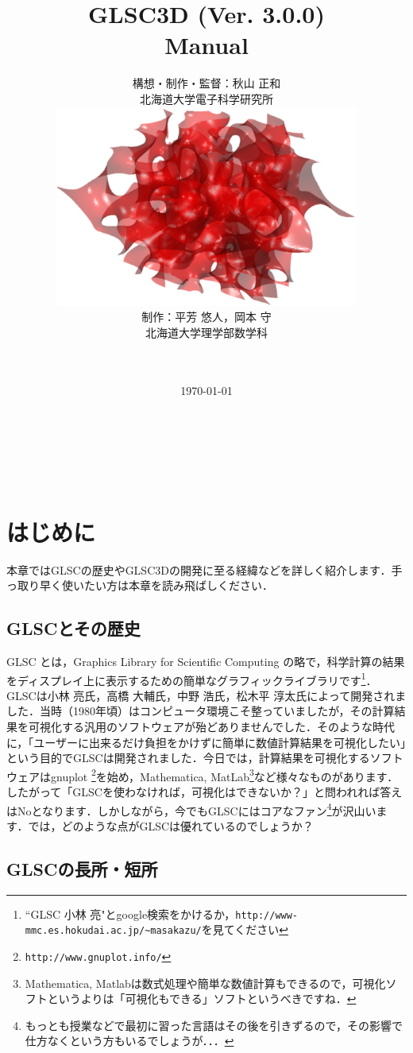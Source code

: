 \documentclass[platex,a4paper,12pt]{jsarticle}%
\title{\vspace{10mm}\Huge{GLSC3D (Ver. 3.0.0) \\Manual}}
\author{\Large{構想・制作・監督：秋山 正和}\\\vspace{5mm}
北海道大学電子科学研究所\\
	\includegraphics[width=100mm]{Figures/eps/CoverPage.eps}\\
\Large{制作：平芳 悠人，岡本 守}\\
北海道大学理学部数学科\\
\\
\\
\date{\today}
}
\begin{document}
\maketitle
\thispagestyle{empty}


\newpage
\thispagestyle{empty}
　
\newpage

\setcounter{tocdepth}{3}
\tableofcontents

\newpage
\thispagestyle{empty}
　
\newpage

\section{はじめに}

本章ではGLSCの歴史やGLSC3Dの開発に至る経緯などを詳しく紹介します．手っ取り早く使いたい方は本章を読み飛ばしください．

\subsection{GLSCとその歴史}

GLSC とは，Graphics Library for Scientific Computing の略で，科学計算の結果をディスプレイ上に表示するための簡単なグラフィックライブラリです\footnote{``GLSC 小林 亮"とgoogle検索をかけるか，\verb|http://www-mmc.es.hokudai.ac.jp/~masakazu/|を見てください}．GLSCは小林 亮氏，高橋 大輔氏，中野 浩氏，松木平 淳太氏によって開発されました．当時（1980年頃）はコンピュータ環境こそ整っていましたが，その計算結果を可視化する汎用のソフトウェアが殆どありませんでした．そのような時代に，「ユーザーに出来るだけ負担をかけずに簡単に数値計算結果を可視化したい」という目的でGLSCは開発されました．今日では，計算結果を可視化するソフトウェアはgnuplot \footnote{\verb|http://www.gnuplot.info/|}を始め，Mathematica, MatLab\footnote{Mathematica, Matlabは数式処理や簡単な数値計算もできるので，可視化ソフトというよりは「可視化もできる」ソフトというべきですね．}など様々なものがあります．したがって「GLSCを使わなければ，可視化はできないか？」と問われれば答えはNoとなります．しかしながら，今でもGLSCにはコアなファン\footnote{もっとも授業などで最初に習った言語はその後を引きずるので，その影響で仕方なくという方もいるでしょうが．．．}が沢山います．では，どのような点がGLSCは優れているのでしょうか？

\subsection{GLSCの長所・短所}
\end{document}
